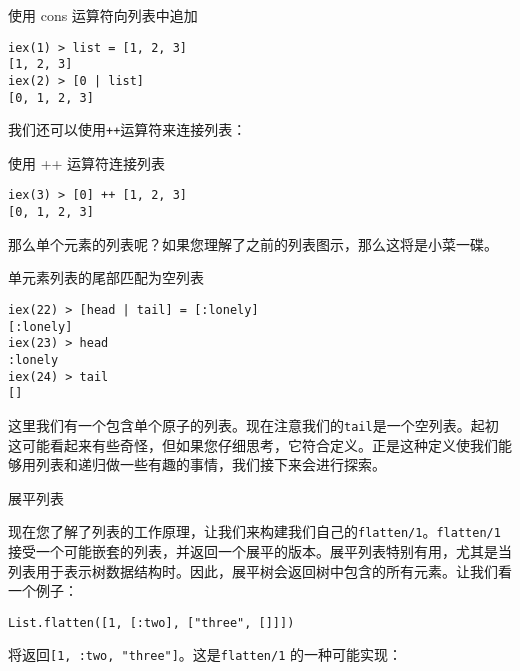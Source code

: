 \begin{code}{使用 cons 运算符向列表中追加}
\begin{verbatim}
iex(1) > list = [1, 2, 3]
[1, 2, 3]
iex(2) > [0 | list]
[0, 1, 2, 3]
\end{verbatim}
\label{lst:use_the_cons_operator_to_append_to_a_list}
\end{code}

我们还可以使用\texttt{++}运算符来连接列表：

\begin{code}{使用 ++ 运算符连接列表}
\begin{verbatim}
iex(3) > [0] ++ [1, 2, 3]
[0, 1, 2, 3]
\end{verbatim}
\label{lst:use_the_++_operator_to_concatenate_lists}
\end{code}

那么单个元素的列表呢？如果您理解了之前的列表图示，那么这将是小菜一碟。

\begin{code}{单元素列表的尾部匹配为空列表}
\begin{verbatim}
iex(22) > [head | tail] = [:lonely]
[:lonely]
iex(23) > head
:lonely
iex(24) > tail
[]
\end{verbatim}
\label{lst:single_element_list_tail_matches_an_empty_list}
\end{code}

这里我们有一个包含单个原子的列表。现在注意我们的\texttt{tail}是一个空列表。起初这可能看起来有些奇怪，但如果您仔细思考，它符合定义。正是这种定义使我们能够用列表和递归做一些有趣的事情，我们接下来会进行探索。


\begin{example}{展平列表}
\end{example}

现在您了解了列表的工作原理，让我们来构建我们自己的\texttt{flatten/1}。\texttt{flatten/1}接受一个可能嵌套的列表，并返回一个展平的版本。展平列表特别有用，尤其是当列表用于表示树数据结构时。因此，展平树会返回树中包含的所有元素。让我们看一个例子：

\begin{code}{}
\begin{verbatim}
List.flatten([1, [:two], ["three", []]])
\end{verbatim}
\end{code}

将返回\texttt{[1, :two, "three"]}。这是\texttt{flatten/1} 的一种可能实现：


